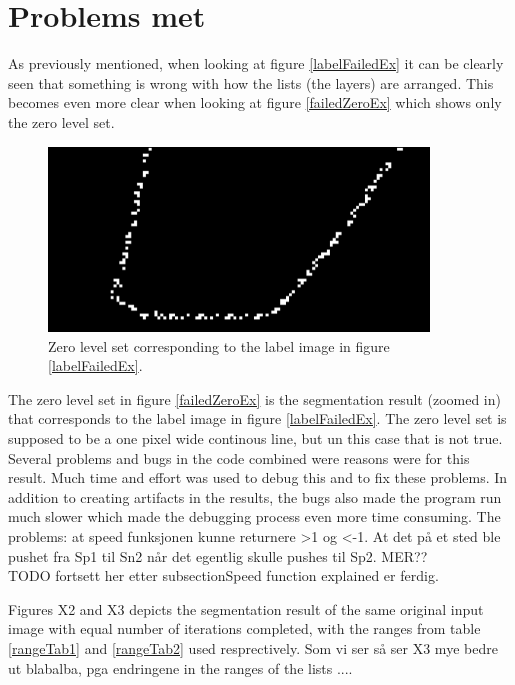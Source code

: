 \section{Problems met}
As previously mentioned, when looking at figure \ref{labelFailedEx} it can be clearly seen that something is wrong with how the lists (the layers) are arranged. This becomes even more clear when looking at figure \ref{failedZeroEx} which shows only the zero level set.
\begin{figure}[h!]
\centering
\includegraphics[width=0.90\textwidth]{implemented/failedZeroEx}
\caption{Zero level set corresponding to the label image in figure \ref{labelFailedEx}.}
\label{labelOkEx}
\end{figure}
The zero level set in figure \ref{failedZeroEx} is the segmentation result (zoomed in) that corresponds to the label image in figure \ref{labelFailedEx}. The zero level set is supposed to be a one pixel wide continous line, but un this case that is not true. Several problems and bugs in the code combined were reasons were for this result. Much time and effort was used to debug this and to fix these problems. In addition to creating artifacts in the results, the bugs also made the program run much slower which made the debugging process even more time consuming. The problems: at speed funksjonen kunne returnere >1 og <-1. At det på et sted ble pushet fra Sp1 til Sn2 når det egentlig skulle pushes til Sp2. MER??\\ TODO fortsett her etter subsection{Speed function explained} er ferdig.


Figures X2 and X3 depicts the segmentation result of the same original input image with equal number of iterations completed, with the ranges from table  \ref{rangeTab1} and \ref{rangeTab2} used resprectively. Som vi ser så ser X3 mye bedre ut blabalba, pga endringene in the ranges of the lists
....

